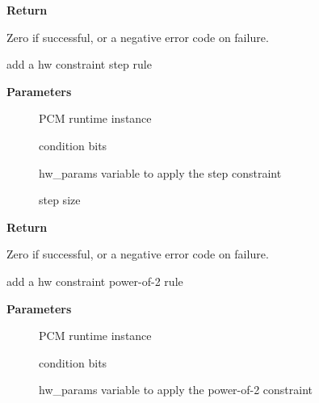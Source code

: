 \documentclass[a4paper,8pt,english]{sphinxmanual}
\begin{document}
\textbf{Return}

Zero if successful, or a negative error code on failure.

\begin{fulllineitems}
\label{sound/kernel-api/alsa-driver-api:c.snd_pcm_hw_constraint_step}
add a hw constraint step rule

\end{fulllineitems}


\textbf{Parameters}
\begin{description}
\item[{}] \leavevmode
PCM runtime instance

\item[{}] \leavevmode
condition bits

\item[{}] \leavevmode
hw\_params variable to apply the step constraint

\item[{}] \leavevmode
step size

\end{description}

\textbf{Return}

Zero if successful, or a negative error code on failure.

\begin{fulllineitems}
\label{sound/kernel-api/alsa-driver-api:c.snd_pcm_hw_constraint_pow2}
add a hw constraint power-of-2 rule

\end{fulllineitems}


\textbf{Parameters}
\begin{description}
\item[{}] \leavevmode
PCM runtime instance

\item[{}] \leavevmode
condition bits

\item[{}] \leavevmode
hw\_params variable to apply the power-of-2 constraint

\end{description}
\end{document}
